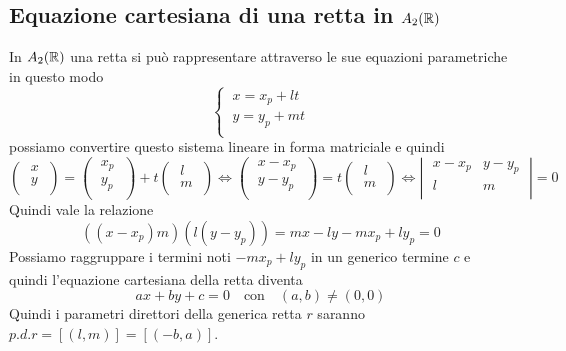 \documentclass[twoside]{report}
\begin{document}
\subsection{Equazione cartesiana di una retta in \(A_2(\RR )\)}
In \(A_2(\RR )\) una retta si può rappresentare attraverso le sue equazioni parametriche in questo modo \[
\begin{cases}
    \ x = x_p + lt \\
    \ y = y_p + mt \\
\end{cases}
\] possiamo convertire questo sistema lineare in forma matriciale e quindi \[
\left( \;
\begin{matrix}
    x \\
    y \\
\end{matrix} \;
\right) = 
\left( \; \begin{matrix}
    x_p \\
    y_p \\
\end{matrix} \; \right) +
t  
\left( \; \begin{matrix}
    l \\
    m \\
\end{matrix} \; \right) \iff 
\left( \; \begin{matrix}
    x - x_p \\
    y - y_p \\
\end{matrix} \; \right) = t
\left( \; \begin{matrix}
    l \\
    m \\
\end{matrix} \; \right) \iff 
\left| \;
\begin{matrix}
    x - x_p & y - y_p \\
    l & m \\
\end{matrix} \;
\right| = 0
\] 
Quindi vale la relazione \[
    ((x-x_p) m) (l (y-y_p)) = mx - ly -mx_p + ly_p = 0
\] Possiamo raggruppare i termini noti \(-mx_p + ly_p\) in un generico termine \(c\) e quindi l'equazione cartesiana della retta diventa \[
ax + by + c = 0 \quad \text{con}\quad (a,b) \neq (0,0)
\] Quindi i parametri direttori della generica retta \(r\) saranno \(p.d.r = [(l,m)] = [(-b, a)]\).
\end{document}
